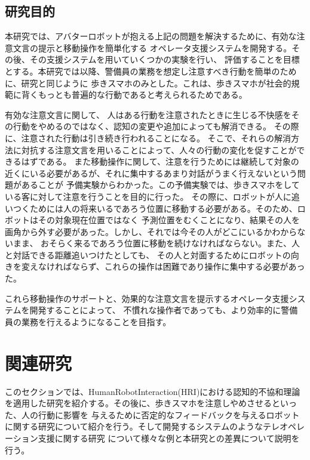 \documentclass[11pt,a4j]{jreport}
\begin{document}
\section{研究目的}
本研究では、アバターロボットが抱える上記の問題を解決するために、有効な注意文言の提示と移動操作を簡単化する
オペレータ支援システムを開発する。その後、その支援システムを用いていくつかの実験を行い、
評価することを目標とする。本研究では以降、警備員の業務を想定し注意すべき行動を簡単のために、研究\cite{Schneider2022,Mizumaru2019}と同じように
歩きスマホのみとした。これは、歩きスマホが社会的規範に背くもっとも普遍的な行動であると考えられるためである。

有効な注意文言に関して、
人はある行動を注意されたときに生じる不快感をその行動をやめるのではなく、認知の変更や追加によっても解消できる。
その際に、注意された行動は引き続き行われることになる。
そこで、それらの解消方法に対抗する注意文言を用いることによって、人々の行動の変化を促すことができるはずである。
また移動操作に関して、注意を行うためには継続して対象の近くにいる必要があるが、それに集中するあまり対話がうまく行えないという問題があることが
予備実験からわかった。この予備実験では、歩きスマホをしている客に対して注意を行うことを目的に行った。
その際に、ロボットが人に追いつくためには人の将来いるであろう位置に移動する必要がある。そのため、ロボットはその対象現在位置ではなく
予測位置をむくことになり、結果その人を画角から外す必要があった。しかし、それでは今その人がどこにいるかわからないまま、
おそらく来るであろう位置に移動を続けなければならない。また、人と対話できる距離追いつけたとしても、
その人と対面するためにロボットの向きを変えなければならず、これらの操作は困難であり操作に集中する必要があった。


これら移動操作のサポートと、効果的な注意文言を提示するオペレータ支援システムを開発することによって、
不慣れな操作者であっても、より効率的に警備員の業務を行えるようになることを目指す。



\chapter{関連研究}
このセクションでは、HumanRobotInteraction(HRI)における認知的不協和理論を適用した研究を紹介する。その後に、歩きスマホを注意しやめさせるといった、人の行動に影響を
与えるために否定的なフィードバックを与えるロボットに関する研究について紹介を行う。そして開発するシステムのようなテレオペレーション支援に関する研究
について様々な例と本研究との差異について説明を行う。
\end{document}
